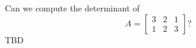 {
Can we compute the determinant of 
\[A = 
\begin{bmatrix}
	3 & 2 & 1\\
	1 & 2 & 3
\end{bmatrix}?
\]
}
{
TBD
}
